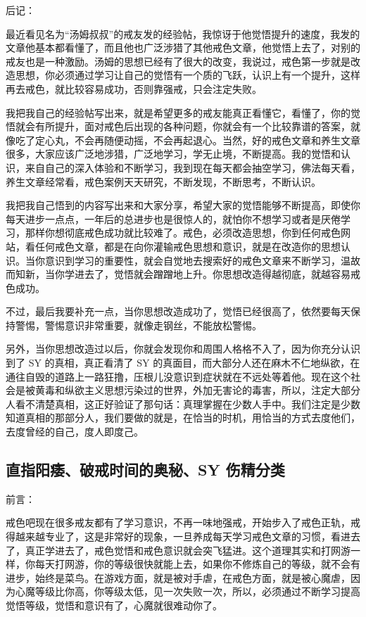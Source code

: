 \documentclass[fontset=founder]{ctexart}
\begin{document}
后记：

最近看见名为“汤姆叔叔”的戒友发的经验帖，我惊讶于他觉悟提升的速度，我发的文章他基本都看懂了，而且他也广泛涉猎了其他戒色文章，他觉悟上去了，对别的戒友也是一种激励。汤姆的思想已经有了很大的改变，我说过，戒色第一步就是改造思想，你必须通过学习让自己的觉悟有一个质的飞跃，认识上有一个提升，这样再去戒色，就比较容易成功，否则靠强戒，只会注定失败。

我把我自己的经验帖写出来，就是希望更多的戒友能真正看懂它，看懂了，你的觉悟就会有所提升，面对戒色后出现的各种问题，你就会有一个比较靠谱的答案，就像吃了定心丸，不会再随便动摇，不会再起退心。当然，好的戒色文章和养生文章很多，大家应该广泛地涉猎，广泛地学习，学无止境，不断提高。我的觉悟和认识，来自自己的深入体验和不断学习，我到现在每天都会抽空学习，佛法每天看，养生文章经常看，戒色案例天天研究，不断发现，不断思考，不断认识。

我把我自己悟到的内容写出来和大家分享，希望大家的觉悟能够不断提高，即使你每天进步一点点，一年后的总进步也是很惊人的，就怕你不想学习或者是厌倦学习，那样你想彻底戒色成功就比较难了。戒色，必须改造思想，你到任何戒色网站，看任何戒色文章，都是在向你灌输戒色思想和意识，就是在改造你的思想认识。当你意识到学习的重要性，就会自觉地去搜索好的戒色文章来不断学习，温故而知新，当你学进去了，觉悟就会蹭蹭地上升。你思想改造得越彻底，就越容易戒色成功。

不过，最后我要补充一点，当你思想改造成功了，觉悟已经很高了，依然要每天保持警惕，警惕意识非常重要，就像走钢丝，不能放松警惕。

另外，当你思想改造过以后，你就会发现你和周围人格格不入了，因为你充分认识到了 SY 的真相，真正看清了 SY 的真面目，而大部分人还在麻木不仁地纵欲，在通往自毁的道路上一路狂撸，压根儿没意识到症状就在不远处等着他。现在这个社会是被黄毒和纵欲主义思想污染过的世界，外加无害论的毒害，所以，注定大部分人看不清楚真相，这正好验证了那句话：真理掌握在少数人手中。我们注定是少数知道真相的那部分人，我们要做的就是，在恰当的时机，用恰当的方式去度他们，去度曾经的自己，度人即度己。

\subsection{直指阳痿、破戒时间的奥秘、SY 伤精分类}

前言：

戒色吧现在很多戒友都有了学习意识，不再一味地强戒，开始步入了戒色正轨，戒得越来越专业了，这是非常好的现象，一旦养成每天学习戒色文章的习惯，看进去了，真正学进去了，戒色觉悟和戒色意识就会突飞猛进。这个道理其实和打网游一样，你每天打网游，你的等级很快就能上去，如果你不修炼自己的等级，就不会有进步，始终是菜鸟。在游戏方面，就是被对手虐，在戒色方面，就是被心魔虐，因为心魔等级比你高，你等级太低，见一次失败一次，所以，必须通过不断学习提高觉悟等级，觉悟和意识有了，心魔就很难动你了。
\end{document}
